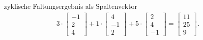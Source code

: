 \begin{ExCalc}
zyklische Faltungsergebnis als Spaltenvektor
\begin{align}
3 \cdot
\begin{bmatrix}
-1 \\
 2 \\
 4
\end{bmatrix}
+
1 \cdot
\begin{bmatrix}
4\\
-1\\
2
\end{bmatrix}
+ 5 \cdot
\begin{bmatrix}
2\\
4\\
-1
\end{bmatrix}
=
\begin{bmatrix}
11\\
25\\
 9
\end{bmatrix}.
\end{align}
%



\end{ExCalc}
